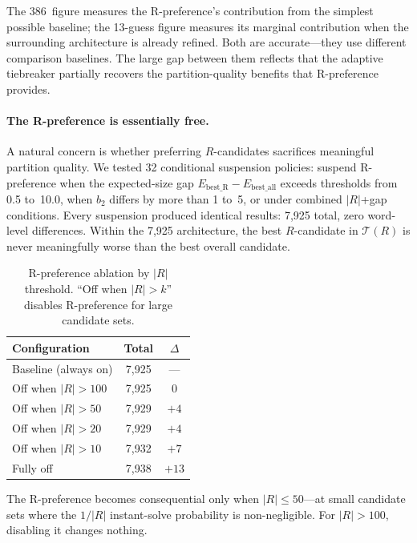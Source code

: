 \documentclass[11pt]{article}
\begin{document}
	The 386~figure measures the R-preference's contribution from the simplest possible baseline; the 13-guess figure measures its marginal contribution when the surrounding architecture is already refined.  Both are accurate---they use different comparison baselines.  The large gap between them reflects that the adaptive tiebreaker partially recovers the partition-quality benefits that R-preference provides.
	
	\paragraph{The R-preference is essentially free.}
	A natural concern is whether preferring $R$-candidates sacrifices meaningful partition quality.  We tested 32 conditional suspension policies: suspend R-preference when the expected-size gap $E_{\text{best\_R}} - E_{\text{best\_all}}$ exceeds thresholds from 0.5 to~10.0, when $b_2$ differs by more than 1 to~5, or under combined $|R|$+gap conditions.  Every suspension produced identical results: 7,925 total, zero word-level differences.  Within the 7,925 architecture, the best $R$-candidate in $\mathcal{T}(R)$ is never meaningfully worse than the best overall candidate.
	
	\begin{table}[h]
		\centering
		\caption{R-preference ablation by $|R|$ threshold.  ``Off when $|R| > k$'' disables R-preference for large candidate sets.}
		\label{tab:rpref_ablation}
		\begin{tabular}{@{}lcc@{}}
			\toprule
			Configuration & Total & $\Delta$ \\
			\midrule
			Baseline (always on) & 7,925 & --- \\
			Off when $|R| > 100$ & 7,925 & 0 \\
			Off when $|R| > 50$ & 7,929 & $+4$ \\
			Off when $|R| > 20$ & 7,929 & $+4$ \\
			Off when $|R| > 10$ & 7,932 & $+7$ \\
			Fully off & 7,938 & $+13$ \\
			\bottomrule
		\end{tabular}
	\end{table}
	
	The R-preference becomes consequential only when $|R| \leq 50$---at small candidate sets where the $1/|R|$ instant-solve probability is non-negligible.  For $|R| > 100$, disabling it changes nothing.
	
\end{document}
